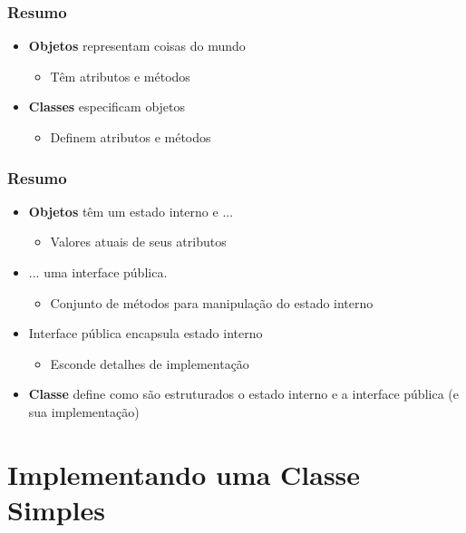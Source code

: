 \documentclass[aspectratio=169]{beamer}
\begin{document}
\begin{frame}\frametitle{Resumo}
\begin{itemize}
	\item \textbf{Objetos} representam coisas do mundo
	\begin{itemize}
		\item Têm atributos e métodos
	\end{itemize}
	\item \textbf{Classes} especificam objetos
	\begin{itemize}
		\item Definem atributos e métodos
	\end{itemize}
\end{itemize}
\end{frame}

\begin{frame}\frametitle{Resumo}
\begin{itemize}
	\item \textbf{Objetos} têm um estado interno e ...
	\begin{itemize}
		\item Valores atuais de seus atributos
	\end{itemize}
	\item ... uma interface pública.
	\begin{itemize}
		\item Conjunto de métodos para manipulação do estado interno
	\end{itemize}
	\item Interface pública encapsula estado interno
	\begin{itemize}
		\item Esconde detalhes de implementação
	\end{itemize}
	\item \textbf{Classe} define como são estruturados o estado interno e a interface pública (e sua implementação)
\end{itemize}
\end{frame}

\section{Implementando uma Classe Simples}
\end{document}
